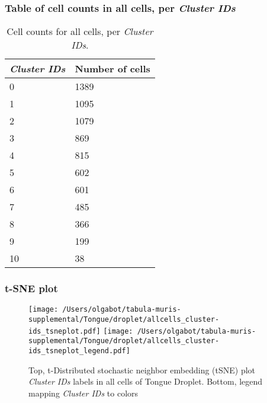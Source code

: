 \subsubsection{Table of cell counts in all cells, per \emph{Cluster IDs}}\begin{table}[h]
\centering
\label{my-label}
\begin{tabular}{@{}ll@{}}
\toprule

\emph{Cluster IDs}& Number of cells \\ \midrule
0 & 1389 \\

1 & 1095 \\

2 & 1079 \\

3 & 869 \\

4 & 815 \\

5 & 602 \\

6 & 601 \\

7 & 485 \\

8 & 366 \\

9 & 199 \\

10 & 38 \\
\bottomrule
\end{tabular}
\caption{Cell counts for all cells, per \emph{Cluster IDs}.}
\end{table}

\clearpage
\subsubsection{t-SNE plot}
\begin{figure}[h]
\centering
\texttt{[image: /Users/olgabot/tabula-muris-supplemental/Tongue/droplet/allcells\_cluster-ids\_tsneplot.pdf]}
\texttt{[image: /Users/olgabot/tabula-muris-supplemental/Tongue/droplet/allcells\_cluster-ids\_tsneplot\_legend.pdf]}
\caption{Top, t-Distributed stochastic neighbor embedding (tSNE) plot  \emph{Cluster IDs} labels in all cells of Tongue Droplet. Bottom, legend mapping \emph{Cluster IDs} to colors}
\end{figure}


\clearpage

